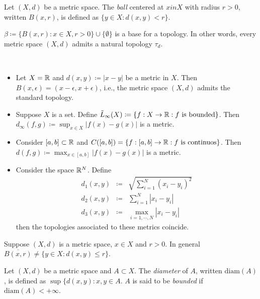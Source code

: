 \documentclass{techreport}
\begin{document}
\begin{definition}
	Let $(X,d)$ be a metric space.
	The \emph{ball} centered at $x in X$ with radius $r > 0$, written $B(x,r)$, is defined as $\{ y \in X : d(x,y) < r\}$.
\end{definition}

\begin{lemma}
	$\beta \coloneqq \{ B(x,r) : x \in X, r > 0 \} \cup \{ \emptyset \}$ is a base for a topology.
	In other words, every metric space $(X,d)$ admits a natural topology $\tau_d$.
\end{lemma}

\begin{example}\
	\begin{itemize}
		\item Let $X = \mathbb{R}$ and $d(x,y) \coloneqq |x-y|$ be a metric in $X$.
		Then $B(x,\epsilon) = (x-\epsilon,x+\epsilon)$, i.e., the metric space $(X,d)$ admits the standard topology.
		\item Suppose $X$ is a set.
		Define $\tilde{L}_\infty(X) \coloneqq \{ f :  X \to \mathbb{R} : f~\text{is bounded} \}$.
		Then $d_\infty(f,g) \coloneqq \sup_{x \in X} |f(x) - g(x)|$ is a metric.
		\item Consider $[a,b] \subset \mathbb{R}$ and $C([a,b]) = \{ f : [a,b] \to \mathbb{R} : f~\text{is continuos}\}$.
		Then $d(f,g) \coloneqq \max_{x \in [a,b]} |f(x)-g(x)|$ is a metric.
		\item Consider the space $\mathbb{R}^N$.
		Define
		\begin{eqnarray*}
			d_1(x,y) & \coloneqq & \sqrt{\sum_{i=1}^N (x_i-y_i)^2} \\
			d_2(x,y) & \coloneqq & \sum_{i=1}^N |x_i - y_i| \\
			d_3(x,y) & \coloneqq & \max_{i=1,\cdots,N} |x_i - y_i|
		\end{eqnarray*}
		then the topologies associated to these metrics coincide.
	\end{itemize}
\end{example}

\begin{remark}
	Suppose $(X,d)$ is a metric space, $x \in X$ and $r > 0$.
	In general $\overline{B(x,r)} \neq \{y \in X : d(x,y) \le r \}$.
\end{remark}

\begin{definition}
	Let $(X,d)$ be a metric space and $A \subset X$.
	The \emph{diameter} of $A$, written $\mathrm{diam}(A)$, is defined as $\sup \{ d(x,y) : x,y \in A$.
	$A$ is said to be \emph{bounded} if $\mathrm{diam}(A) < +\infty$.
\end{definition}
\end{document}

